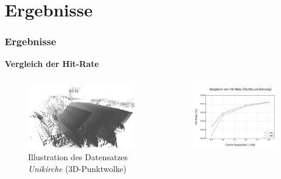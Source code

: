 \documentclass[presentation]{beamer}
\begin{document}
\section{Ergebnisse}
\begin{frame}
	\frametitle{Ergebnisse}
	\baselineskip
	\color{dd-gray} \textbf{Vergleich der Hit-Rate} \color{black}

	\begin{columns}[c] %
		\begin{figure}
			\centering
			\includegraphics[width=1\linewidth]{figures/Unikirche2.png}
			\caption{Illustration des Datensatzes \emph{Unikirche} (3D-Punktwolke)}
			\label{fig:sub6}
		\end{figure}
		\begin{figure}
			\centering
			\includegraphics[width=0.9\linewidth]{figures/results/DensityLimitationHitRates.png}

\end{figure}
\end{columns}
\end{frame}
\end{document}
